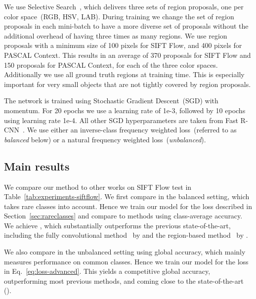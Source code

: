 We use Selective Search~\cite{uijlings13ijcv}, which delivers three sets of region proposals, one per color space~(RGB, HSV, LAB).
During training we change the set of region proposals in each mini-batch to have a more diverse set of proposals without the additional overhead of having three times as many regions.
We use region proposals with a minimum size of 100 pixels for SIFT Flow, and 400 pixels for PASCAL Context.
This results in an average of 370 proposals for SIFT Flow and 150 proposals for PASCAL Context, for each of the three color spaces.
Additionally we use all ground truth regions at training time.
This is especially important for very small objects that are not tightly covered by region proposals.

The network is trained using Stochastic Gradient Descent~(SGD) with momentum.
For 20 epochs we use a learning rate of 1e-3, followed by 10 epochs using learning rate 1e-4.
All other SGD hyperparameters are taken from Fast R-CNN~\cite{girshick15iccv}.
We use either an inverse-class frequency weighted loss~(referred to as {\em balanced} below) or a natural frequency weighted
loss~({\em unbalanced}).

\subsection{Main results}

We compare our method to other works on SIFT Flow test in Table~\ref{tab:experiments-siftflow}.
We first compare in the balanced setting, which takes rare classes into
account.
Hence we train our model for the loss described in Section~\ref{sec:rareclasses} and compare to methods using class-average accuracy.
We achieve , which substantially outperforms the previous state-of-the-art, including the fully convolutional method~\cite{eigen15iccv} by  and the region-based method~\cite{caesar15bmvc} by .

We also compare in the unbalanced setting using global accuracy, which mainly measures performance on common classes.
Hence we train our model for the loss in Eq.~\eqref{eq:loss-advanced}.
This yields a competitive  global accuracy, outperforming most previous methods, and coming close to the state-of-the-art~\cite{eigen15iccv} ().

